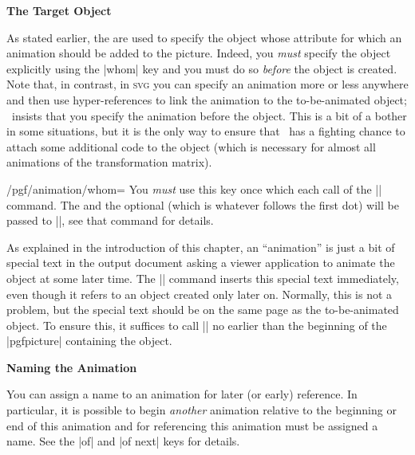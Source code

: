 \begin{command}{\pgfanimateattribute{}}
    \medskip
    \textbf{The Target Object}

    As stated earlier, the  are used to specify the object whose
    attribute for which an animation should be added to the picture. Indeed,
    you \emph{must} specify the object explicitly using the |whom| key and you
    must do so \emph{before} the object is created. Note that, in contrast, in
    \textsc{svg} you can specify an animation more or less anywhere and then
    use hyper-references to link the animation to the to-be-animated object;
    \pgfname\ insists that you specify the animation before the object. This is
    a bit of a bother in some situations, but it is the only way to ensure that
    \pgfname\ has a fighting chance to attach some additional code to the
    object (which is necessary for almost all animations of the transformation
    matrix).

    \begin{key}{/pgf/animation/whom=}
        You \emph{must} use this key once which each call of the
        |\pgfanimateattribute| command. The  and the optional
         (which is whatever follows the first dot) will be passed to
        |\pgfidrefnextuse|, see that command for details.
    \end{key}

    As explained in the introduction of this chapter, an ``animation'' is just
    a bit of special text in the output document asking a viewer application to
    animate the object at some later time. The |\pgfanimateattribute| command
    inserts this special text immediately, even though it refers to an object
    created only later on. Normally, this is not a problem, but the special
    text should be on the same page as the to-be-animated object. To ensure
    this, it suffices to call |\pgfanimateattribute| no earlier than the
    beginning of the |pgfpicture| containing the object.


    \medskip
    \textbf{Naming the Animation}

    You can assign a name to an animation for later (or early) reference. In
    particular, it is possible to begin \emph{another} animation relative to
    the beginning or end of this animation and for referencing this animation
    must be assigned a name. See the |of| and |of next| keys for details.


\end{command}
